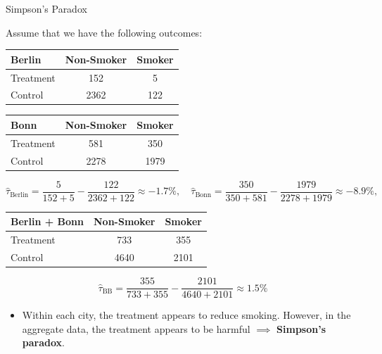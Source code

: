 \documentclass[11pt,aspectratio=169]{beamer}
\begin{document}
\begin{frame}{Simpson's Paradox}

Assume that we have the following outcomes:

\begin{center}
\begin{tabular}{lcc}
\hline
Berlin & Non-Smoker & Smoker \\
\hline
Treatment & 152 & 5 \\
Control & 2362 & 122 \\
\hline
\end{tabular}
\quad
\begin{tabular}{lcc}
\hline
Bonn & Non-Smoker & Smoker \\
\hline
Treatment & 581 & 350 \\
Control & 2278 & 1979 \\
\hline
\end{tabular}
\end{center}

$$\widehat{\tau}_{\text{Berlin}} = \frac{5}{152 + 5} - \frac{122}{2362 + 122} \approx -1.7\%, \quad \widehat{\tau}_{\text{Bonn}} = \frac{350}{350 + 581} - \frac{1979}{2278 + 1979} \approx -8.9\%,$$

\begin{center}
\begin{tabular}{lcc}
\hline
Berlin + Bonn & Non-Smoker & Smoker \\
\hline
Treatment & 733 & 355 \\
Control & 4640 & 2101 \\
\hline
\end{tabular}
\pause
\quad
$$\widehat{\tau}_{\text{BB}} = \frac{355}{733 + 355} - \frac{2101}{4640 + 2101} \approx 1.5\%$$
\end{center}

\begin{itemize}
    \item Within each city, the treatment appears to reduce smoking. However, in the aggregate data, the treatment appears to be harmful $\implies$ \textbf{Simpson's paradox}.
\end{itemize}
\end{frame}
\end{document}
